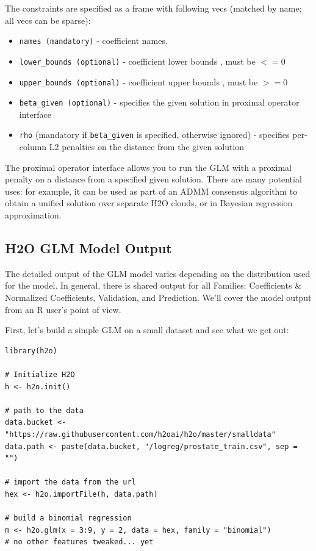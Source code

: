 \documentclass{article}[11pt]
\begin{document}
The constraints are specified as a frame with following vecs (matched by name; all vecs can be sparse):
\begin{itemize}
\item \texttt{names (mandatory)}  - coefficient names. 
\item \texttt{lower\_bounds (optional)} - coefficient lower bounds , must be $<= 0$
\item \texttt{upper\_bounds (optional)} - coefficient upper bounds , must be $>= 0$
\item \texttt{beta\_given (optional)} - specifies the given solution in proximal operator interface
\item \texttt{rho} (mandatory if \texttt{beta\_given} is specified, otherwise ignored) - specifies per-column L2 penalties on the distance from the given solution
\end{itemize}
 
The proximal operator interface allows you to run the GLM with a proximal penalty on a distance from a specified given solution. There are many potential uses: for example, it can be used as part of an ADMM consensus algorithm to obtain a unified solution over separate H2O clouds, or in Bayesian regression approximation.

\subsection{H2O GLM Model Output}
The detailed output of the GLM model varies depending on the distribution used for the model. In general, there is shared output for all Families: Coefficients \& Normalized Coefficients, Validation, and Prediction. We'll cover the model output from an R user's  point of view.

First, let's build a simple GLM on a small dataset and see what we get out:

\begin{lstlisting}[breaklines,basicstyle=\ttfamily]
library(h2o)

# Initialize H2O
h <- h2o.init()

# path to the data
data.bucket <- "https://raw.githubusercontent.com/h2oai/h2o/master/smalldata"
data.path <- paste(data.bucket, "/logreg/prostate_train.csv", sep = "")

# import the data from the url
hex <- h2o.importFile(h, data.path)

# build a binomial regression
m <- h2o.glm(x = 3:9, y = 2, data = hex, family = "binomial")  
# no other features tweaked... yet
\end{lstlisting}
\end{document}
